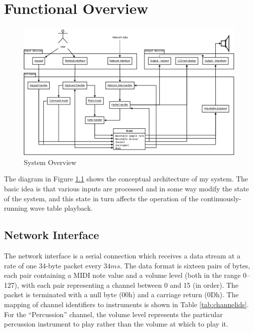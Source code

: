 \chapter{Functional Overview}

\begin{nowordcount}
\begin{figure}[htbp]
\centering
\includegraphics[totalheight=0.55\textheight,angle=90]{images/overview}
\caption{System Overview}\label{fig:systemoverview}
\end{figure}
\end{nowordcount}

The diagram in Figure \ref{fig:systemoverview} shows the conceptual architecture of my system.  The 
basic idea is that various inputs are processed and in some way modify the state of the system, and 
this state in turn affects the operation of the continuously-running wave table playback.

\section{Network Interface}
\label{sec:overview:network}

The network interface is a serial connection which receives a data stream at a rate of one 34-byte 
packet every $34ms$.  The data format is sixteen pairs of bytes, each pair containing a MIDI note 
value and a volume level (both in the range 0--127), with each pair representing a channel between 0 
and 15 (in order).  The packet is terminated with a null byte (00h) and a carriage return (0Dh).  
The mapping of channel identifiers to instruments is shown in Table \ref{tab:channelids}.  For the 
``Percussion'' channel, the volume level represents the particular percussion instrument to play 
rather than the volume at which to play it.

